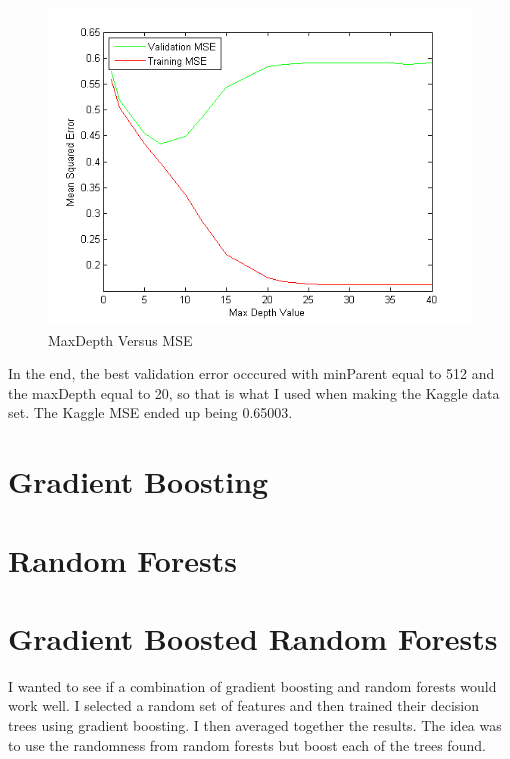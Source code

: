 \documentclass[twoside,11pt]{article}
\theoremstyle{definition}
\begin{document}
\begin{figure}[h]
\centering
\includegraphics[width=4 in]{maxDepthVersusMSE2.png}
\caption{MaxDepth Versus MSE}
\end{figure}

In the end, the best validation error occcured with minParent equal to 512 and the maxDepth equal to 20, so that is what I used when making the Kaggle data set. The Kaggle MSE ended up being 0.65003. 

\section*{Gradient Boosting}



\section*{Random Forests}



\section*{Gradient Boosted Random Forests}

I wanted to see if a combination of gradient boosting and random forests would work well. I selected a random set of features and then trained their decision trees using gradient boosting. I then averaged together the results. The idea was to use the randomness from random forests but boost each of the trees found. 
\end{document}
